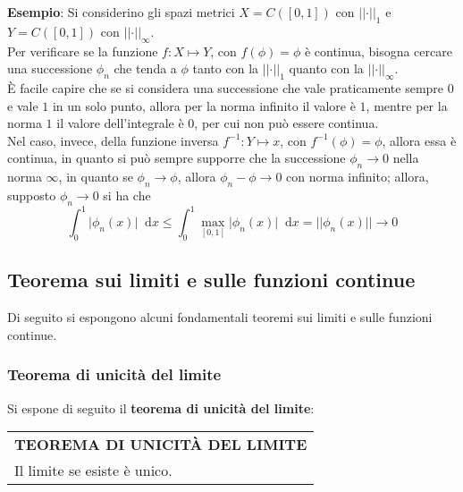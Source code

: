 \documentclass[a4paper]{extarticle}
\renewcommand\arraystretch{}
\newcommand*\dif{\mathop{}\!\mathrm{d}}
\begin{document}
\vspace{1em}
\noindent
\textbf{Esempio}: Si considerino gli spazi metrici $X=C([0,1])$ con $\vert \vert \cdot \vert \vert_1$ e $Y=C([0,1])$ con $\vert \vert \cdot \vert \vert_{\infty}$.\\
Per verificare se la funzione $f : X \longmapsto Y$, con $f(\phi)=\phi$ è continua, bisogna cercare una successione $\phi_n$ che tenda a $\phi$ tanto con la $\vert \vert \cdot \vert \vert_1$ quanto con la $\vert \vert \cdot \vert \vert_\infty$.\\
È facile capire che se si considera una successione che vale praticamente sempre $0$ e vale $1$ in un solo punto, allora per la norma infinito il valore è $1$, mentre per la norma $1$ il valore dell'integrale è $0$, per cui non può essere continua.\\
Nel caso, invece, della funzione inversa $f^{-1} : Y \longmapsto x$, con $f^{-1}(\phi)=\phi$, allora essa è continua, in quanto si può sempre supporre che la successione $\phi_n \to 0$ nella norma $\infty$, in quanto se $\phi_n \to \phi$, allora $\phi_n-\phi \to 0$ con norma infinito; allora, supposto $\phi_n \to 0$ si ha che
\[\int_0^1 \vert \phi_n(x) \vert \dif x \leq \int_0^1 \underset{[0,1]}{\max} \vert \phi_n(x) \vert \dif x = \vert \vert \phi_n(x) \vert \vert \to 0\]


\vspace{1em}
\noindent
\subsection{Teorema sui limiti e sulle funzioni continue}
Di seguito si espongono alcuni fondamentali teoremi sui limiti e sulle funzioni continue.

\vspace{1em}
\noindent
\subsubsection{Teorema di unicità del limite}
Si espone di seguito il \textbf{teorema di unicità del limite}:

\vspace{1em}
\setlength{\tabcolsep}{14pt}
\renewcommand{\arraystretch}{2}
\noindent
\begin{tabularx}{\textwidth}{@{}|P|@{}}
    \hline
    {\textbf{TEOREMA DI UNICITÀ DEL LIMITE}}\\
    \parbox{\linewidth}{Il limite se esiste è unico. \vspace{3mm}}\\
    \hline
\end{tabularx}
\end{document}
